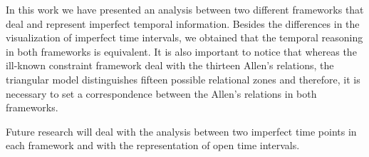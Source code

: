 In this work we have presented an analysis between two different frameworks that deal and represent imperfect temporal information. Besides the differences in the visualization of imperfect time intervals, we obtained that the temporal reasoning in both frameworks is equivalent. It is also important to notice that whereas the ill-known constraint framework deal with the thirteen Allen's relations, the triangular model distinguishes fifteen possible relational zones and therefore, it is necessary to set a correspondence between the Allen's relations in both frameworks. 

Future research will deal with the analysis between two imperfect time points in each framework and with the representation of open time intervals. 